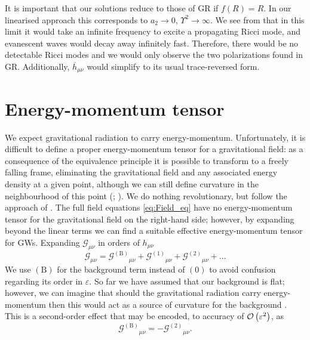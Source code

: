 It is important that our solutions reduce to those of GR if $f(R) = R$. In our linearised approach this corresponds to $a_2 \rightarrow 0$, $\Upsilon^2 \rightarrow \infty$. We see from  that in this limit it would take an infinite frequency to excite a propagating Ricci mode, and evanescent waves would decay away infinitely fast. Therefore, there would be no detectable Ricci modes and we would only observe the two polarizations found in GR. Additionally, $\overline{h}_{\mu\nu}$ would simplify to its usual trace-reversed form.

\section{Energy-momentum tensor\label{sec:EM_tensor}}

We expect gravitational radiation to carry energy-momentum. Unfortunately, it is difficult to define a proper energy-momentum tensor for a gravitational field: as a consequence of the equivalence principle it is possible to transform to a freely falling frame, eliminating the gravitational field and any associated energy density at a given point, although we can still define curvature in the neighbourhood of this point (\citealt[section 20.4]{Misner1973}; \citealt[section 17.11]{Hobson2006}). We do nothing revolutionary, but follow the approach of \citet{Isaacson1968, Isaacson1968a}. The full field equations \eqref{eq:Field_eq} have no energy-momentum tensor for the gravitational field on the right-hand side; however, by expanding beyond the linear terms we can find a suitable effective energy-momentum tensor for GWs. Expanding $\mathcal{G}_{\mu\nu}$ in orders of $h_{\mu\nu}$
\begin{equation}
\mathcal{G}_{\mu\nu} = {\mathcal{G}^{(\text{B})}}_{\mu\nu} + {\mathcal{G}^{(1)}}_{\mu\nu} + {\mathcal{G}^{(2)}}_{\mu\nu} + \ldots
\label{eq:G_exp}
\end{equation}
We use $(\text{B})$ for the background term instead of $(0)$ to avoid confusion regarding its order in $\varepsilon$. So far we have assumed that our background is flat; however, we can imagine that should the gravitational radiation carry energy-momentum then this would act as a source of curvature for the background \citep[section 4.4b]{Wald1984}. This is a second-order effect that may be encoded, to accuracy of $\mathcal{O}\left({\varepsilon^2}\right)$, as \citep[section 15.4]{Rindler2006}
\begin{equation}
{\mathcal{G}^{(\text{B})}}_{\mu\nu} = -{\mathcal{G}^{(2)}}_{\mu\nu}.
\end{equation}
